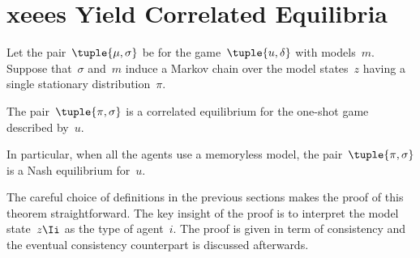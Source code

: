 \section{\acp{xeee} Yield Correlated Equilibria}
\label{sec:xeees_yield_correlated_equilibria}

\begin{theorem}
Let the pair~\(\tuple{\mu, \sigma}\) be  for the game~\(\tuple{u, \delta}\) with models~\(m\).
Suppose that~\(\sigma\) and~\(m\) induce a Markov chain over the model states~\(z\) having a single stationary distribution~\(\pi\).

The pair~\(\tuple{\pi, \sigma}\) is a correlated equilibrium for the one-shot game described by~\(u\).
\end{theorem}

In particular, when all the agents use a memoryless model, the pair~\(\tuple{\pi, \sigma}\) is a Nash equilibrium for~\(u\).

The careful choice of definitions in the previous sections makes the proof of this theorem straightforward.
The key insight of the proof is to interpret the model state~\(z\Ii\) as the type of agent~\(i\).
The proof is given in term of consistency and the eventual consistency counterpart is discussed afterwards.

